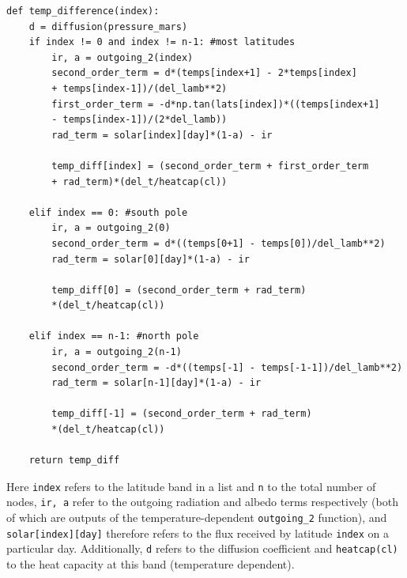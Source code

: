 \documentclass[12pt,onecolumn]{revtex4-2}    %
\begin{document}
\begin{verbatim}
def temp_difference(index): 
	d = diffusion(pressure_mars)
    if index != 0 and index != n-1: #most latitudes
        ir, a = outgoing_2(index)
        second_order_term = d*(temps[index+1] - 2*temps[index] 
        + temps[index-1])/(del_lamb**2)
        first_order_term = -d*np.tan(lats[index])*((temps[index+1] 
        - temps[index-1])/(2*del_lamb))
        rad_term = solar[index][day]*(1-a) - ir
        
        temp_diff[index] = (second_order_term + first_order_term 
        + rad_term)*(del_t/heatcap(cl))
        
    elif index == 0: #south pole
        ir, a = outgoing_2(0)
        second_order_term = d*((temps[0+1] - temps[0])/del_lamb**2)
        rad_term = solar[0][day]*(1-a) - ir

        temp_diff[0] = (second_order_term + rad_term)
        *(del_t/heatcap(cl))

    elif index == n-1: #north pole
        ir, a = outgoing_2(n-1)
        second_order_term = -d*((temps[-1] - temps[-1-1])/del_lamb**2)
        rad_term = solar[n-1][day]*(1-a) - ir

        temp_diff[-1] = (second_order_term + rad_term)
        *(del_t/heatcap(cl))

    return temp_diff
\end{verbatim}

Here \verb|index| refers to the latitude band in a list and \verb|n| to the total number of nodes, \verb|ir, a| refer to the outgoing radiation and albedo terms respectively (both of which are outputs of the temperature-dependent \verb|outgoing_2| function), and \verb|solar[index][day]| therefore refers to the flux received by latitude \verb|index| on a particular day. Additionally, \verb|d| refers to the diffusion coefficient and \verb|heatcap(cl)| to the heat capacity at this band (temperature dependent).
\end{document}
